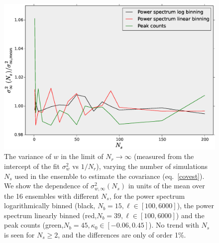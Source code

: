 \documentclass[reprint,aps,prd,superscriptaddress,showkeys,showpacs]{revtex4-1}
\begin{document}
\begin{figure}
\includegraphics[scale=0.3]{Figures/scaling_ns.eps}
\caption{The variance of $w$ in the limit of $N_r\rightarrow\infty$
  (measured from the intercept of the fit $\sigma^2_w$ vs $1/N_r$),
  varying the number of simulations $N_s$ used in the ensemble to
  estimate the covariance (eq.~\ref{covest}). We show the dependence
  of $\sigma_{w,\infty}^2(N_s)$ in units of the mean over the 16
  ensembles with different $N_s$, for the power spectrum
  logarithmically binned (black, $N_b=15,\ell\in[100,6000]$), the
  power spectrum linearly binned (red,$N_b=39,\ell\in[100,6000]$) and
  the peak counts (green,$N_b=45,\kappa_0\in[-0.06,0.45]$).  No trend
  with $N_s$ is seen for $N_s\geq 2$, and the differences are only of
  order 1\%.}
\label{wvar_ns}
\end{figure}
\end{document}
